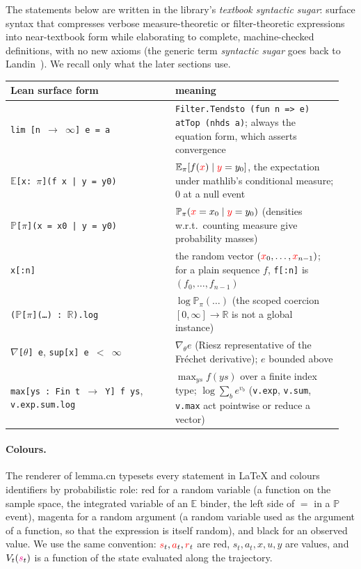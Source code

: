 \documentclass[11pt,a4paper]{article}
\newcommand{\R}{\mathbb{R}}
\newcommand{\E}{\mathbb{E}}
\newcommand{\Prb}{\mathbb{P}}
\newcommand{\rv}[1]{{\color{red}#1}}       %
\newcommand{\ra}[1]{{\color{magenta}#1}}   %
\newcommand{\sv}{\rv{s}}
\newcommand{\av}{\rv{a}}
\newcommand{\rw}{\rv{r}}
\begin{document}
The statements below are written in the library's \emph{textbook syntactic sugar}: surface syntax that compresses verbose measure-theoretic or filter-theoretic expressions into near-textbook form while elaborating to complete, machine-checked definitions, with no new axioms (the generic term \emph{syntactic sugar} goes back to Landin~\cite{landin1964mechanical}).
We recall only what the later sections use.

\begin{center}
\small
\begin{tabular}{@{}>{\raggedright\arraybackslash}p{0.47\linewidth}>{\raggedright\arraybackslash}p{0.48\linewidth}@{}}
\toprule
Lean surface form & meaning \\
\midrule
\texttt{lim [n $\to$ $\infty$] e = a} & \texttt{Filter.Tendsto (fun n => e) atTop (nhds a)}; always the equation form, which asserts convergence \\
\texttt{$\mathbb{E}$[x: $\pi$](f x | y = y0)} & $\E_\pi[f(\rv{x})\mid\rv{y}=y_0]$, the expectation under mathlib's conditional measure; $0$ at a null event \\
\texttt{$\mathbb{P}$[$\pi$](x = x0 | y = y0)} & $\Prb_\pi(\rv{x}=x_0\mid\rv{y}=y_0)$ (densities w.r.t.\ counting measure give probability masses) \\
\texttt{x[:n]} & the random vector $(\rv{x}_0,\dots,\rv{x}_{n-1})$; for a plain sequence $f$, \texttt{f[:n]} is $(f_0,\dots,f_{n-1})$ \\
\texttt{($\mathbb{P}$[$\pi$](\dots) : $\mathbb{R}$).log} & $\log\Prb_\pi(\dots)$ (the scoped coercion $[0,\infty]\to\R$ is not a global instance) \\
\texttt{$\nabla$[$\theta$] e}, \texttt{sup[x] e $<$ $\infty$} & $\nabla_\theta e$ (Riesz representative of the Fr\'echet derivative); $e$ bounded above \\
\texttt{max[ys : Fin t $\to$ Y] f ys}, \texttt{v.exp.sum.log} & $\max_{ys}f(ys)$ over a finite index type; $\log\sum_b e^{v_b}$ (\texttt{v.exp}, \texttt{v.sum}, \texttt{v.max} act pointwise or reduce a vector) \\
\bottomrule
\end{tabular}
\end{center}

\paragraph{Colours.}
The renderer of lemma.cn typesets every statement in \LaTeX{} and colours identifiers by probabilistic role: \rv{red} for a random variable (a function on the sample space, the integrated variable of an $\E$ binder, the left side of $=$ in a $\Prb$ event), \ra{magenta} for a random argument (a random variable used as the argument of a function, so that the expression is itself random), and black for an observed value.
We use the same convention: $\sv_t,\av_t,\rw_t$ are red, $s_t,a_t,x,u,y$ are values, and $V_t(\ra{s}_t)$ is a function of the state evaluated along the trajectory.
\end{document}

